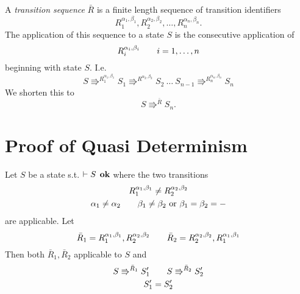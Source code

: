 \begin{definition}
  A \emph{transition sequence} $\bar{R}$ is a finite length sequence of
  transition identifiers
  \begin{equation*}
    R_1^{\alpha_1, \beta_1}, R_2^{\alpha_2, \beta_2}, \dots, R_n^{\alpha_n,
    \beta_n}.
  \end{equation*}
  The application of this sequence to a state $S$ is the consecutive application
  of
  \begin{equation*}
    R_i^{\alpha_i, \beta_i} \quad\quad i = 1, \dots, n
  \end{equation*}
  beginning with state $S$. I.e.
  \begin{equation*} 
    S \Rrightarrow^{R_1^{\alpha_1, \beta_1}} S_1 \Rrightarrow^{R^{\alpha_2,
    \beta_2}} S_2  \: \dots \: S_{n-1} \Rrightarrow^{R_n^{\alpha_n, \beta_n}} S_n
  \end{equation*}
  We shorten this to
  \begin{equation*}
    S \Rrightarrow^{\bar{R}} S_n.
  \end{equation*}
\end{definition}


\section{Proof of Quasi Determinism}
\label{sec:proof_of_quasi_determinism}

\begin{lemma} \label{lem:lemma1}
  Let $S$ be a state s.t. $\vdash S \:\: \mbox{\bf ok}$ where the two transitions
  \begin{equation*}
    \begin{gathered}
      R_1^{\alpha_1, \beta_1} \neq R_2^{\alpha_2, \beta_2} \\
      \alpha_1 \neq \alpha_2 \quad\quad \beta_1 \neq \beta_2 \text{ or } \beta_1 =
      \beta_2 = - 
    \end{gathered}
  \end{equation*}
  are applicable.
  Let
  \begin{equation*}
    \bar{R}_1  = R_1^{\alpha_1, \beta_1}, R_2^{\alpha_2, \beta_2} \quad\quad
    \bar{R}_2 = R_2^{\alpha_2, \beta_2}, R_1^{\alpha_1, \beta_1}
  \end{equation*}
  Then both $\bar{R}_1, \bar{R}_2$ applicable to $S$ and
  \begin{equation*}
    \begin{gathered}
      S \Rrightarrow^{\bar{R}_1} S'_1 \quad\quad S \Rrightarrow^{\bar{R}_2} S'_2
      \\
      S'_1 = S'_2
    \end{gathered}
  \end{equation*}
\end{lemma}

